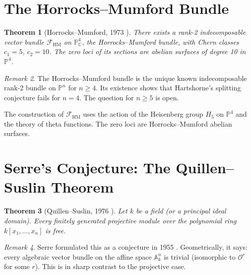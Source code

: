 \documentclass[12pt,a4paper]{amsart}
\newtheorem{theorem}{Theorem}[section]
\theoremstyle{definition}
\theoremstyle{remark}
\newtheorem{remark}[theorem]{Remark}
\newcommand{\PP}{\mathbb{P}}
\newcommand{\CC}{\mathbb{C}}
\newcommand{\OO}{\mathcal{O}}
\begin{document}
\section{The Horrocks--Mumford Bundle}

\begin{theorem}[Horrocks--Mumford, 1973 \cite{HorrocksMumford1973}]
There exists a rank-2 indecomposable vector bundle $\mathcal{F}_\mathrm{HM}$
on $\PP^4_\CC$, the \emph{Horrocks--Mumford bundle}, with Chern classes
$c_1 = 5$, $c_2 = 10$.  The zero loci of its sections are abelian surfaces
of degree 10 in $\PP^4$.
\end{theorem}

\begin{remark}
The Horrocks--Mumford bundle is the unique known indecomposable rank-2 bundle
on $\PP^n$ for $n \ge 4$.  Its existence shows that Hartshorne's splitting
conjecture fails for $n = 4$.  The question for $n \ge 5$ is open.
\end{remark}

The construction of $\mathcal{F}_\mathrm{HM}$ uses the action of the
Heisenberg group $H_5$ on $\PP^4$ and the theory of theta functions.
The zero loci are Horrocks--Mumford abelian surfaces.

\section{Serre's Conjecture: The Quillen--Suslin Theorem}

\begin{theorem}[Quillen--Suslin, 1976 \cite{Quillen1976,Suslin1976}]
\label{thm:quillen-suslin}
Let $k$ be a field (or a principal ideal domain).  Every finitely generated
projective module over the polynomial ring $k[x_1,\ldots,x_n]$ is free.
\end{theorem}

\begin{remark}
Serre formulated this as a conjecture in 1955 \cite{Serre1955}.
Geometrically, it says: every algebraic vector bundle on the affine space
$\mathbb{A}^n_k$ is trivial (isomorphic to $\OO^r$ for some $r$).
This is in sharp contrast to the projective case.
\end{remark}
\end{document}
